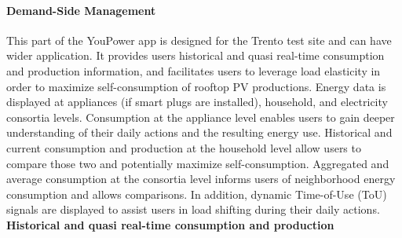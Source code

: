 \paragraph{Demand-Side Management} 

This part of the YouPower app is designed for the Trento test site and can have wider application.
It provides users historical and quasi real-time consumption and production information, and facilitates users to leverage load elasticity in order to maximize self-consumption of rooftop PV productions. 
Energy data is displayed at appliances (if smart plugs are installed), household, and electricity consortia levels. %
%
Consumption at the appliance level enables users to gain deeper understanding of their daily actions and the resulting energy use. 
% 
Historical and current consumption and production at the household level allow users to compare those two and potentially maximize self-consumption. 
% 
Aggregated and average consumption at the consortia level informs users of neighborhood energy consumption and allows comparisons.  
% 
In addition, dynamic Time-of-Use (ToU) signals are displayed  to assist users in load shifting during their daily actions. \\

\textbf{Historical and quasi real-time consumption and production}

